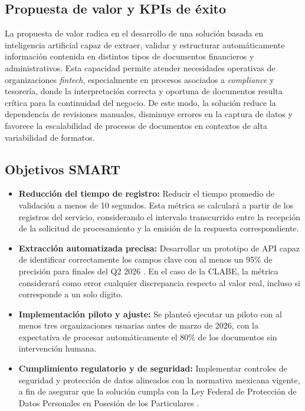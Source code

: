 \subsection{Propuesta de valor y KPIs de éxito}

La propuesta de valor radica en el desarrollo de una solución basada en inteligencia artificial capaz de extraer, validar y estructurar automáticamente información contenida en distintos tipos de documentos financieros y administrativos. Esta capacidad permite atender necesidades operativas de organizaciones \textit{fintech}, especialmente en procesos asociados a \textit{compliance} y tesorería, donde la interpretación correcta y oportuna de documentos resulta crítica para la continuidad del negocio. De este modo, la solución reduce la dependencia de revisiones manuales, disminuye errores en la captura de datos y favorece la escalabilidad de procesos de documentos en contextos de alta variabilidad de formatos.

\subsection*{Objetivos SMART}
\begin{itemize}
  
    \item \textbf{Reducción del tiempo de registro:} Reducir el tiempo promedio de validación a menos de 10 segundos. Esta métrica se calculará a partir de los registros del servicio, considerando el intervalo transcurrido entre la recepción de la solicitud de procesamiento y la emisión de la respuesta correspondiente.

    \item \textbf{Extracción automatizada precisa:} Desarrollar un prototipo de API capaz de identificar correctamente los campos clave con al menos un 95\% de precisión para finales del Q2 2026 \cite{Xu2020LayoutLM}. En el caso de la CLABE, la métrica considerará como error cualquier discrepancia respecto al valor real, incluso si corresponde a un solo dígito.
  
    \item \textbf{Implementación piloto y ajuste:} Se planteó ejecutar un piloto con al menos tres organizaciones usuarias antes de marzo de 2026, con la expectativa de procesar automáticamente el 80\% de los documentos sin intervención humana. 
    
    \item \textbf{Cumplimiento regulatorio y de seguridad:} Implementar controles de seguridad y protección de datos alineados con la normativa mexicana vigente, a fin de asegurar que la solución cumpla con la Ley Federal de Protección de Datos Personales en Posesión de los Particulares \cite{lfpdppp}.
    
\end{itemize}

